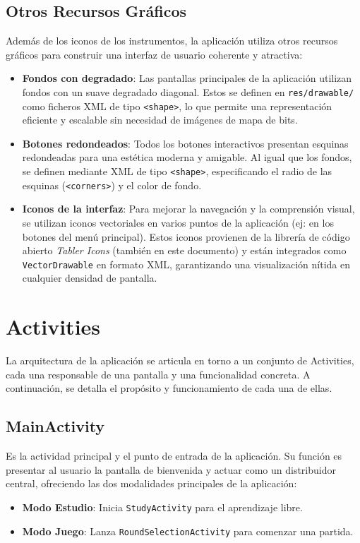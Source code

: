 \documentclass{article}
\newcommand{\iconpath}{/home/khz/git/tabler-icons/icons/outline-white/}
\newcommand{\icon}[1]{}
\begin{document}
\subsection{Otros Recursos Gráficos \icon{photo-scan}}
Además de los iconos de los instrumentos, la aplicación utiliza otros recursos gráficos para construir una interfaz de usuario coherente y atractiva:
\begin{itemize}
    \item \textbf{Fondos con degradado}: Las pantallas principales de la aplicación utilizan fondos con un suave degradado diagonal. Estos se definen en \texttt{res/drawable/} como ficheros XML de tipo \texttt{<shape>}, lo que permite una representación eficiente y escalable sin necesidad de imágenes de mapa de bits.
    \item \textbf{Botones redondeados}: Todos los botones interactivos presentan esquinas redondeadas para una estética moderna y amigable. Al igual que los fondos, se definen mediante XML de tipo \texttt{<shape>}, especificando el radio de las esquinas (\texttt{<corners>}) y el color de fondo.
    \item \textbf{Iconos de la interfaz}: Para mejorar la navegación y la comprensión visual, se utilizan iconos vectoriales en varios puntos de la aplicación (ej: en los botones del menú principal). Estos iconos provienen de la librería de código abierto \textit{Tabler Icons} (también en este documento) y están integrados como \texttt{VectorDrawable} en formato XML, garantizando una visualización nítida en cualquier densidad de pantalla.
\end{itemize}


\section{Activities}

La arquitectura de la aplicación se articula en torno a un conjunto de Activities, cada una responsable de una pantalla y una funcionalidad concreta. A continuación, se detalla el propósito y funcionamiento de cada una de ellas.

\subsection{MainActivity \icon{layout-dashboard}}
Es la actividad principal y el punto de entrada de la aplicación. Su función es presentar al usuario la pantalla de bienvenida y actuar como un distribuidor central, ofreciendo las dos modalidades principales de la aplicación:
\begin{itemize}
    \item \textbf{Modo Estudio}: Inicia \texttt{StudyActivity} para el aprendizaje libre.
    \item \textbf{Modo Juego}: Lanza \texttt{RoundSelectionActivity} para comenzar una partida.
\end{itemize}
\end{document}
